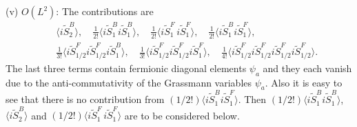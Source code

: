 \documentclass[a4paper,12pt]{article}
\newcommand{\vev}[1]{\langle #1 \rangle}
\begin{document}
(v) $O(L^{2})$:
The contributions are
\begin{eqnarray*}
&&\vev{i\tilde{S}_{2}^B},\quad
\frac{1}{2!}\vev{i\tilde{S}_{1}^B i\tilde{S}_{1}^B},\quad
\frac{1}{2!}\vev{i\tilde{S}_{1}^F \,i\tilde{S}_{1}^F},\quad
\frac{1}{2!}\vev{i\tilde{S}_1^B i\tilde{S}_1^F},\\
&&\frac{1}{3!}\vev{i\tilde{S}_{1/2}^F i\tilde{S}_{1/2}^F
	i\tilde{S}_{1}^B},\quad
  \frac{1}{3!}\vev{i\tilde{S}_{1/2}^F i\tilde{S}_{1/2}^F
	i\tilde{S}_{1}^F},\quad
  \frac{1}{4!}\vev{ i\tilde{S}_{1/2}^F  i\tilde{S}_{1/2}^F
    i\tilde{S}_{1/2}^F  i\tilde{S}_{1/2}^F}.
\end{eqnarray*}
The last three terms contain fermionic diagonal
elements $\psi_a$ and they each vanish due to the anti-commutativity
of the Grassmann variables $\psi_a$. Also it is easy to see that
there is no contribution from $(1/2!)\vev{i\tilde{S}_1^B
i\tilde{S}_1^F}$.
Then $(1/2!)\vev{i\tilde{S}_{1}^B  i\tilde{S}_{1}^B}$,
$\vev{i\tilde{S}_{2}^B}$ and
$(1/2!)\vev{i\tilde{S}_{1}^F \,i\tilde{S}_{1}^F}$ are to be considered
below.
\end{document}

